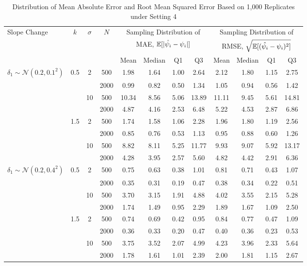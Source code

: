 \documentclass [12pt, proquest] {uwthesis}[2016/11/22]
\begin{document}
\begin{table}
\centering
\renewcommand\arraystretch{0.75}
\begin{tabular}{@{} lccccccccccc @{}} 
\toprule
    {Slope Change} & {$k$} & $\sigma$ & $N$ & \multicolumn{4}{c}{Sampling Distribution of} & \multicolumn{4}{c}{Sampling Distribution of} \\
    & & & & \multicolumn{4}{c}{MAE, $\mathbb{E}[\lvert \Hat{\psi_i} - \psi_i \rvert]$} & \multicolumn{4}{c}{RMSE, $\sqrt{\mathbb{E}[(\Hat{\psi_i} - \psi_i)^2]}$}\\
    \cmidrule(lr){5-8} \cmidrule(lr){9-12}
     & & & & Mean & Median & Q1 & Q3 & Mean & Median & Q1 & Q3 \\
\midrule
    $\delta_1 \sim \mathcal{N}(0.2, 0.1^2)$ & 0.5 & 2 & 500 & 1.98 & 1.64 & 1.00 & 2.64 & 2.12 & 1.80 & 1.15 & 2.75 \\
                     &     &   & 2000 & 0.99 & 0.82 & 0.50 & 1.34 & 1.05 & 0.94 & 0.56 & 1.42  \\
                     &     & 10 & 500 & 10.34 & 8.56 & 5.06 & 13.89 & 11.11 & 9.45 & 5.61 & 14.81 \\
                     &     &    & 2000 & 4.87 & 4.16 & 2.53 & 6.48 & 5.22 & 4.53 & 2.87 & 6.86 \\
                     & 1.5 & 2 & 500 & 1.74 & 1.58 & 1.06 & 2.28 & 1.96 & 1.80 & 1.19 & 2.56 \\
                     &     &   & 2000 & 0.85 & 0.76 & 0.53 & 1.13 & 0.95 & 0.88 & 0.60 & 1.26 \\
                     &     & 10 & 500 & 8.82 & 8.11 & 5.25 & 11.77 & 9.93 & 9.07 & 5.92 & 13.17 \\
                     &     &    & 2000 & 4.28 & 3.95 & 2.57 & 5.60 & 4.82 & 4.42 & 2.91 & 6.36 \\
\midrule
    $\delta_1 \sim \mathcal{N}(0.2, 0.4^2)$ & 0.5 & 2 & 500 & 0.75 & 0.63 & 0.38 & 1.01 & 0.81 & 0.71 & 0.43 & 1.07  \\
                     &     &   & 2000 & 0.35 & 0.31 & 0.19 & 0.47 & 0.38 & 0.34 & 0.22 & 0.51 \\
                     &     & 10 & 500 & 3.70 & 3.15 & 1.91 & 4.88 & 4.02 & 3.55 & 2.15 & 5.28 \\
                     &     &     & 2000 & 1.74 & 1.49 & 0.95 & 2.29 & 1.89 & 1.67 & 1.09 & 2.50 \\
                     & 1.5 & 2 & 500 & 0.74 & 0.69 & 0.42 & 0.95 & 0.84 & 0.77 & 0.47 & 1.09 \\
                     &     &     & 2000 & 0.36 & 0.33 & 0.20 & 0.47 & 0.40 & 0.36 & 0.23 & 0.53 \\
                     &     & 10 & 500 & 3.75 & 3.52 & 2.07 & 4.99 & 4.23 & 3.96 & 2.33 & 5.64 \\
                     &     &     & 2000 & 1.78 & 1.61 & 1.01 & 2.39 & 2.00 & 1.81 & 1.15 & 2.67 \\    
\bottomrule
\end{tabular}
\caption{Distribution of Mean Absolute Error and Root Mean Squared Error Based on 1,000 Replicates under Setting 4}
\end{table}
\end{document}
